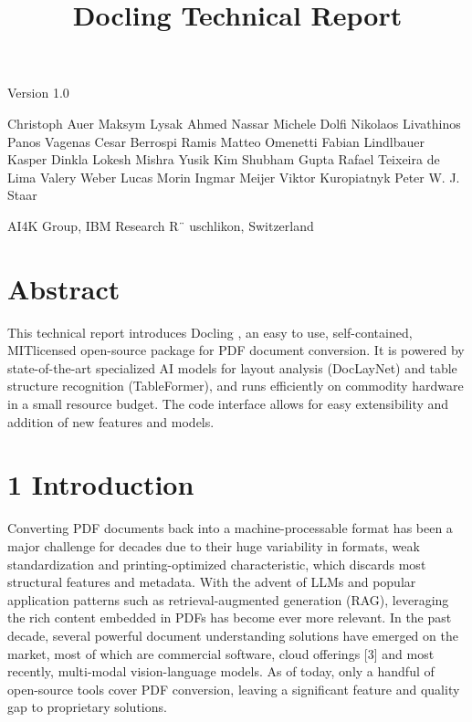 \documentclass[11pt,a4paper]{article}
\title{Docling Technical Report}
\begin{document}
\maketitle

\begin{figure}[h]
\end{figure}

Version 1.0

Christoph Auer Maksym Lysak Ahmed Nassar Michele Dolfi Nikolaos Livathinos Panos Vagenas Cesar Berrospi Ramis Matteo Omenetti Fabian Lindlbauer Kasper Dinkla Lokesh Mishra Yusik Kim Shubham Gupta Rafael Teixeira de Lima Valery Weber Lucas Morin Ingmar Meijer Viktor Kuropiatnyk Peter W. J. Staar

AI4K Group, IBM Research R¨ uschlikon, Switzerland

\section{Abstract}

This technical report introduces Docling , an easy to use, self-contained, MITlicensed open-source package for PDF document conversion. It is powered by state-of-the-art specialized AI models for layout analysis (DocLayNet) and table structure recognition (TableFormer), and runs efficiently on commodity hardware in a small resource budget. The code interface allows for easy extensibility and addition of new features and models.

\section{1 Introduction}

Converting PDF documents back into a machine-processable format has been a major challenge for decades due to their huge variability in formats, weak standardization and printing-optimized characteristic, which discards most structural features and metadata. With the advent of LLMs and popular application patterns such as retrieval-augmented generation (RAG), leveraging the rich content embedded in PDFs has become ever more relevant. In the past decade, several powerful document understanding solutions have emerged on the market, most of which are commercial software, cloud offerings [3] and most recently, multi-modal vision-language models. As of today, only a handful of open-source tools cover PDF conversion, leaving a significant feature and quality gap to proprietary solutions.
\end{document}
